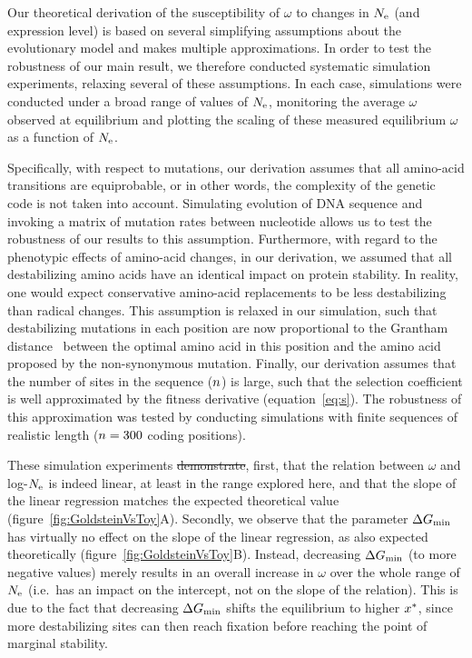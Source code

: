 \documentclass[authoryear]{elsarticle} %
\providecommand{\DIFaddtex}[1]{{\protect\color{blue}\uwave{#1}}} %
\providecommand{\DIFdeltex}[1]{{\protect\color{red}\sout{#1}}}                      %
\providecommand{\DIFaddbegin}{} %
\providecommand{\DIFaddend}{} %
\providecommand{\DIFdelbegin}{} %
\providecommand{\DIFdelend}{} %
\providecommand{\DIFadd}[1]{\texorpdfstring{\DIFaddtex{#1}}{#1}} %
\providecommand{\DIFdel}[1]{\texorpdfstring{\DIFdeltex{#1}}{}} %
\begin{document}
Our theoretical derivation of the susceptibility of $\omega$ to changes in $N_{\text{e}}$ (and expression level) is based on several simplifying assumptions about the evolutionary model and makes multiple approximations.
In order to test the robustness of our main result, we therefore conducted systematic simulation experiments, relaxing several of these assumptions.
In each case, simulations were conducted under a broad range of values of $N_{\text{e}}$, monitoring the average $\omega$ observed at equilibrium and plotting the scaling of these measured equilibrium $\omega$ as a function of $N_{\text{e}}$.

Specifically, with respect to mutations, our derivation assumes that all amino-acid transitions are equiprobable, or in other words, the complexity of the genetic code is not taken into account.
Simulating evolution of {DNA} sequence and invoking a matrix of mutation rates between nucleotide allows us to test the robustness of our results to this assumption.
Furthermore, with regard to the phenotypic effects of amino-acid changes, in our derivation, we assumed that all destabilizing amino acids have an identical impact on protein stability.
In reality, one would expect conservative amino-acid replacements to be less destabilizing than radical changes.
This assumption is relaxed in our simulation, such that destabilizing mutations in each position are now proportional to the Grantham distance~\citep{Grantham1974} between the optimal amino acid in this position and the amino acid proposed by the {non-synonymous} mutation.
Finally, our derivation assumes that the number of sites in the sequence ($n$) is large, such that the selection coefficient is well approximated by the fitness derivative (equation~\ref{eq:s}).
The robustness of this approximation was tested by conducting simulations with finite sequences of realistic length ($n=300$ coding positions).

These simulation experiments \DIFdelbegin \DIFdel{demonstrate}\DIFdelend \DIFaddbegin \DIFadd{illustrate}\DIFaddend , first, that the relation between $\omega$ and log-$N_{\text{e}}$ is indeed linear, at least in the range explored here, and that the slope of the linear regression matches the expected theoretical value (figure~\ref{fig:GoldsteinVsToy}A).
Secondly, we observe that the parameter $\Delta G_{\text{min}}$ has virtually no effect on the slope of the linear regression, as also expected theoretically (figure~\ref{fig:GoldsteinVsToy}B).
Instead, decreasing $\Delta G_{\text{min}}$ (to more negative values) merely results in an overall increase in $\omega$ over the whole range of $N_{\text{e}}$ (i.e.~has an impact on the intercept, not on the slope of the relation).
This is due to the fact that decreasing $\Delta G_{\text{min}}$ shifts the equilibrium to higher $x^{*}$, since more destabilizing sites can then reach fixation before reaching the point of marginal stability.
\end{document}
